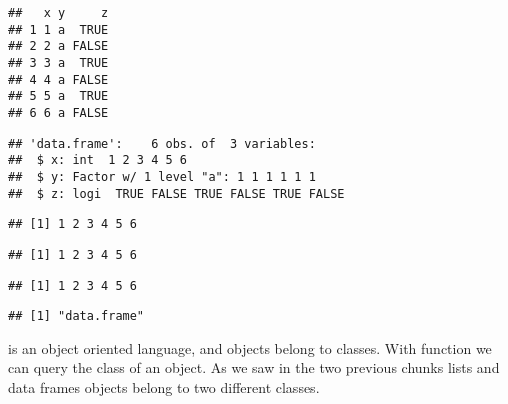 \documentclass[paper=a4,10pt,div=17,headsepline,BCOR=12mm,twoside,open=right]{scrbook}\usepackage{knitr}
\begin{document}
\begin{knitrout}\footnotesize
{}\color{fgcolor}\begin{kframe}
\begin{alltt}
 \hlkwb{<-} \hlstd{(} \hlstd{=} \hlopt{:}\hlstd{,}  \hlstd{=} \hlstd{,}  \hlstd{=} \hlstd{(}\hlstd{,} \hlstd{))}
\end{alltt}
\begin{verbatim}
##   x y     z
## 1 1 a  TRUE
## 2 2 a FALSE
## 3 3 a  TRUE
## 4 4 a FALSE
## 5 5 a  TRUE
## 6 6 a FALSE
\end{verbatim}
\begin{alltt}
\end{alltt}
\begin{verbatim}
## 'data.frame':	6 obs. of  3 variables:
##  $ x: int  1 2 3 4 5 6
##  $ y: Factor w/ 1 level "a": 1 1 1 1 1 1
##  $ z: logi  TRUE FALSE TRUE FALSE TRUE FALSE
\end{verbatim}
\begin{alltt}
\hlopt{$}
\end{alltt}
\begin{verbatim}
## [1] 1 2 3 4 5 6
\end{verbatim}
\begin{alltt}
\hlstd{a.df[[}\hlstd{]]}
\end{alltt}
\begin{verbatim}
## [1] 1 2 3 4 5 6
\end{verbatim}
\begin{alltt}
\hlstd{a.df[[}\hlstd{]]}
\end{alltt}
\begin{verbatim}
## [1] 1 2 3 4 5 6
\end{verbatim}
\begin{alltt}
\end{alltt}
\begin{verbatim}
## [1] "data.frame"
\end{verbatim}
\end{kframe}
\end{knitrout}

\R is an object oriented language, and objects belong to classes. With function  we can query the class of an object. As we saw in the two previous chunks lists and data frames objects belong to two different classes.
\end{document}
